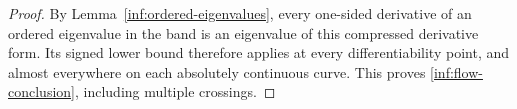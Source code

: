 \begin{proof}
By Lemma~\ref{inf:ordered-eigenvalues}, every one-sided derivative
of an ordered eigenvalue in the band is an eigenvalue of this
compressed derivative form. Its signed lower bound therefore
applies at every differentiability point, and almost everywhere
on each absolutely continuous curve. This proves
\eqref{inf:flow-conclusion}, including multiple crossings.
\end{proof}
